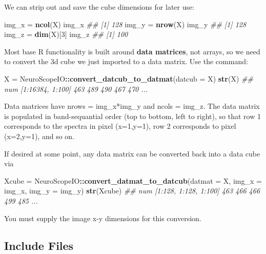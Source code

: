 \documentclass[]{article}
\newenvironment{Shaded}{\begin{snugshade}}{\end{snugshade}}
\newcommand{\CommentTok}[1]{\textcolor[rgb]{0.56,0.35,0.01}{\textit{#1}}}
\newcommand{\DataTypeTok}[1]{\textcolor[rgb]{0.13,0.29,0.53}{#1}}
\newcommand{\DecValTok}[1]{\textcolor[rgb]{0.00,0.00,0.81}{#1}}
\newcommand{\KeywordTok}[1]{\textcolor[rgb]{0.13,0.29,0.53}{\textbf{#1}}}
\newcommand{\NormalTok}[1]{#1}
\newcommand{\OperatorTok}[1]{\textcolor[rgb]{0.81,0.36,0.00}{\textbf{#1}}}
\newcommand{\StringTok}[1]{\textcolor[rgb]{0.31,0.60,0.02}{#1}}
\begin{document}
We can strip out and save the cube dimensions for later use:

\begin{Shaded}
\begin{Highlighting}[]
\NormalTok{img_x =}\StringTok{ }\KeywordTok{ncol}\NormalTok{(X)}
\NormalTok{img_x}
\CommentTok{## [1] 128}
\NormalTok{img_y =}\StringTok{ }\KeywordTok{nrow}\NormalTok{(X)}
\NormalTok{img_y}
\CommentTok{## [1] 128}
\NormalTok{img_z =}\StringTok{ }\KeywordTok{dim}\NormalTok{(X)[}\DecValTok{3}\NormalTok{]}
\NormalTok{img_z}
\CommentTok{## [1] 100}
\end{Highlighting}
\end{Shaded}

Most base R functionality is built around \textbf{data matrices}, not arrays, so we need to convert the 3d cube we just imported to a data matrix. Use the command:

\begin{Shaded}
\begin{Highlighting}[]
\NormalTok{X =}\StringTok{ }\NormalTok{NeuroScopeIO}\OperatorTok{::}\KeywordTok{convert_datcub_to_datmat}\NormalTok{(}\DataTypeTok{datcub =}\NormalTok{ X)}
\KeywordTok{str}\NormalTok{(X)}
\CommentTok{##  num [1:16384, 1:100] 463 489 490 467 470 ...}
\end{Highlighting}
\end{Shaded}

Data matrices have nrows = img\_x*img\_y and ncols = img\_z. The data matrix is populated in band-sequantial order (top to bottom, left to right), so that row 1 corresponds to the spectra in pixel (x=1,y=1), row 2 corresponds to pixel (x=2,y=1), and so on.

If desired at some point, any data matrix can be converted back into a data cube via

\begin{Shaded}
\begin{Highlighting}[]
\NormalTok{Xcube =}\StringTok{ }\NormalTok{NeuroScopeIO}\OperatorTok{::}\KeywordTok{convert_datmat_to_datcub}\NormalTok{(}\DataTypeTok{datmat =}\NormalTok{ X, }\DataTypeTok{img_x =}\NormalTok{ img_x, }\DataTypeTok{img_y =}\NormalTok{ img_y)}
\KeywordTok{str}\NormalTok{(Xcube)}
\CommentTok{##  num [1:128, 1:128, 1:100] 463 466 466 499 485 ...}
\end{Highlighting}
\end{Shaded}

You must supply the image x-y dimensions for this conversion.

\hypertarget{include-files}{%
\subsection{Include Files}\label{include-files}}
\end{document}
